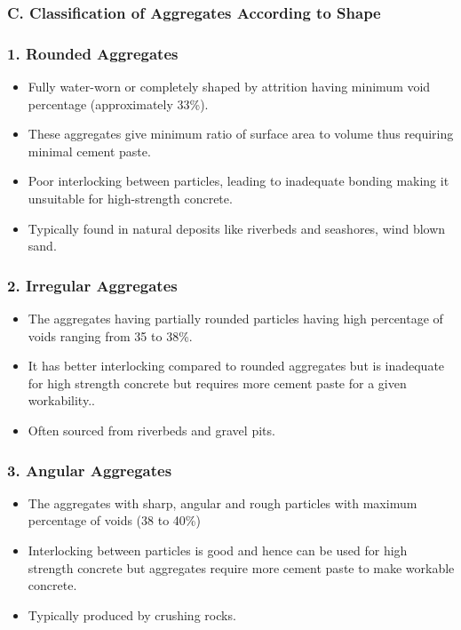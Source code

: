 \documentclass[a4paper,11pt]{book}
\begin{document}
\subsubsection{C. Classification of Aggregates According to Shape}

\subsubsection*{1. Rounded Aggregates}
\begin{itemize}
    \item Fully water-worn or completely shaped by attrition having minimum void percentage (approximately 33\%).
    \item These aggregates give minimum ratio of surface area to volume thus requiring minimal cement paste.
    \item Poor interlocking between particles, leading to inadequate bonding making it unsuitable for high-strength concrete.
    \item Typically found in natural deposits like riverbeds and seashores, wind blown sand.
\end{itemize}

\subsubsection*{2. Irregular Aggregates}

\begin{itemize}
    \item The aggregates having partially rounded particles having high percentage of voids ranging from 35 to 38\%. 
    \item It has better interlocking compared to rounded aggregates but is inadequate for high strength concrete but requires more cement paste for a given workability..
    \item Often sourced from riverbeds and gravel pits.
\end{itemize}


\subsubsection*{3. Angular Aggregates}

\begin{itemize}
    \item The aggregates with sharp, angular and rough particles with maximum percentage of voids (38 to 40\%)
    \item Interlocking between particles is good and hence can be used for high strength concrete but aggregates require more cement paste to make workable concrete.
    \item Typically produced by crushing rocks.
\end{itemize}
\end{document}

